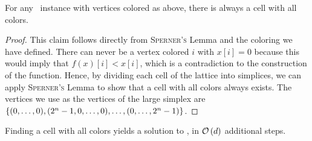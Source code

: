 \begin{claim}
	For any \Tarskistar\ instance with vertices colored as above, there is always a cell with all colors.
\end{claim}
\begin{proof}
	This claim follows directly from \textsc{Sperner's} Lemma and the coloring we have defined. There can never be a vertex colored $i$ with $x[i] = 0$ because this would imply that $f(x)[i] < x[i]$, which is a contradiction to the construction of the function. Hence, by dividing each cell of the lattice into simplices, we can apply \textsc{Sperner's} Lemma to show that a cell with all colors always exists. The vertices we use as the vertices of the large simplex are $\left\{(0, \dots, 0), (2^n - 1, 0, \dots, 0), \dots, (0, \dots, 2^n - 1)\right\}$.
\end{proof}
\begin{claim}
	Finding a cell with all colors yields a solution to \Tarskistar, in $\mathcal{O}\left(d\right)$ additional steps.
\end{claim}
